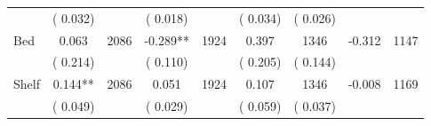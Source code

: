 \begin{tabular}{l*{8}{c}}
                       &       (       0.032)            &                               &       (       0.018)            &                               &       (       0.034)            &       (       0.026) &                  \\
Bed        &              0.063      &       2086       &             -0.289**      &       1924       &              0.397      &       1346  &       -0.312 &       1147       \\
                       &       (       0.214)            &                               &       (       0.110)            &                               &       (       0.205)            &       (       0.144) &                  \\
Shelf        &              0.144**      &       2086       &              0.051      &       1924       &              0.107      &       1346  &       -0.008 &       1169       \\
                       &       (       0.049)            &                               &       (       0.029)            &                               &       (       0.059)            &       (       0.037) &                  \\
\hline \end{tabular}